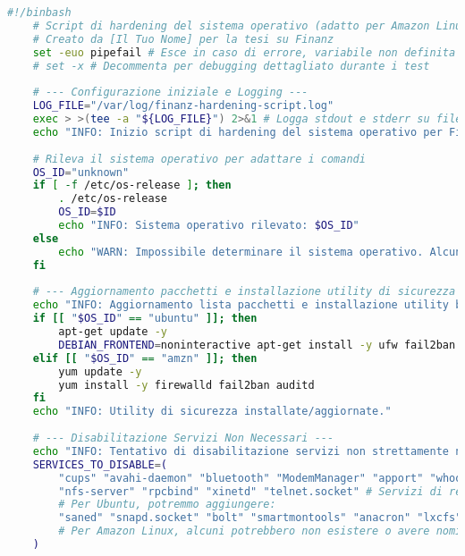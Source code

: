 \begin{lstlisting}[language=Bash, style=bash, caption={Script di Hardening del Sistema Operativo (hardening\_script.sh)}, label={lst:hardening_script_cap2}]
    #!/binbash
    # Script di hardening del sistema operativo (adatto per Amazon Linux 2 e Ubuntu 20.04)
    # Creato da [Il Tuo Nome] per la tesi su Finanz
    set -euo pipefail # Esce in caso di errore, variabile non definita o errore in una pipe
    # set -x # Decommenta per debugging dettagliato durante i test
    
    # --- Configurazione iniziale e Logging ---
    LOG_FILE="/var/log/finanz-hardening-script.log"
    exec > >(tee -a "${LOG_FILE}") 2>&1 # Logga stdout e stderr su file e console
    echo "INFO: Inizio script di hardening del sistema operativo per Finanz - $(date)"
    
    # Rileva il sistema operativo per adattare i comandi
    OS_ID="unknown"
    if [ -f /etc/os-release ]; then
        . /etc/os-release
        OS_ID=$ID
        echo "INFO: Sistema operativo rilevato: $OS_ID"
    else
        echo "WARN: Impossibile determinare il sistema operativo. Alcuni comandi potrebbero fallire."
    fi
    
    # --- Aggiornamento pacchetti e installazione utility di sicurezza base ---
    echo "INFO: Aggiornamento lista pacchetti e installazione utility base (ufw/firewalld, fail2ban, auditd)..."
    if [[ "$OS_ID" == "ubuntu" ]]; then
        apt-get update -y
        DEBIAN_FRONTEND=noninteractive apt-get install -y ufw fail2ban auditd
    elif [[ "$OS_ID" == "amzn" ]]; then
        yum update -y
        yum install -y firewalld fail2ban auditd
    fi
    echo "INFO: Utility di sicurezza installate/aggiornate."
    
    # --- Disabilitazione Servizi Non Necessari ---
    echo "INFO: Tentativo di disabilitazione servizi non strettamente necessari..."
    SERVICES_TO_DISABLE=(
        "cups" "avahi-daemon" "bluetooth" "ModemManager" "apport" "whoopsie" # Comuni
        "nfs-server" "rpcbind" "xinetd" "telnet.socket" # Servizi di rete datati o specifici
        # Per Ubuntu, potremmo aggiungere:
        "saned" "snapd.socket" "bolt" "smartmontools" "anacron" "lxcfs" "speech-dispatcher" 
        # Per Amazon Linux, alcuni potrebbero non esistere o avere nomi diversi
    )
    

\end{lstlisting}
